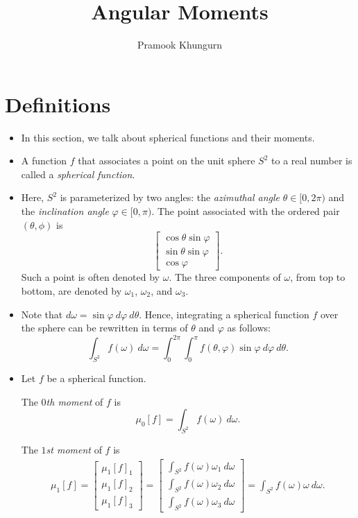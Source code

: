 \documentclass[10pt]{article}
\title{Angular Moments}
\author{Pramook Khungurn}
\begin{document}
	\maketitle
		
	\section{Definitions} %
	\label{sec:angular_moments}
	
		\begin{itemize}
			\item In this section, we talk about spherical functions and their moments.
			
			\item A function $f$ that associates a point on the unit sphere $S^2$ to a real number is called
				a \emph{spherical function}.
				
			\item Here, $S^2$ is parameterized by two angles: the \emph{azimuthal angle} $\theta \in [0, 2\pi)$ and the \emph{inclination angle}
				$\varphi \in [0,\pi)$.
				The point associated with the ordered pair $(\theta, \phi)$ is 
				$$\begin{bmatrix} \cos \theta \sin \varphi \\ \sin\theta\sin\varphi \\ \cos\varphi \end{bmatrix}.$$
				Such a point is often denoted by $\omega.$ The three components of $\omega$, from top to bottom, are denoted by $\omega_1$, $\omega_2$,
				and $\omega_3$.
				
			\item Note that $d\omega = \sin\varphi\ d\varphi\ d\theta$. Hence, integrating a spherical function $f$ over the sphere
				can be rewritten in terms of $\theta$ and $\varphi$ as follows:
				$$\int_{S^2} f(\omega)\ d\omega = \int_{0}^{2\pi} \int_{0}^\pi f(\theta, \varphi) \sin \varphi\ d\varphi\ d\theta.$$
			
			\item Let $f$ be a spherical function. 
				
				The \emph{$0$th moment} of $f$ is $$\mu_0[f] = \int_{S^2} f(\omega)\ d\omega.$$
				
				The \emph{$1$st moment} of $f$ is 
				\begin{align*}
					\mu_1[f] 
					= \begin{bmatrix} \mu_1[f]_1 \\ \mu_1[f]_2 \\ \mu_1[f]_3 \end{bmatrix}
					= \begin{bmatrix} \int_{S^2} f(\omega) \omega_1\ d\omega \\ \int_{S^2} f(\omega) \omega_2\ d\omega \\ \int_{S^2} f(\omega) \omega_3\ d\omega \end{bmatrix}
					= \int_{S^2} f(\omega) \omega\ d\omega.
				\end{align*}
				

\end{itemize}
\end{document}
